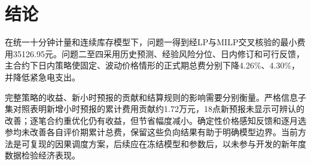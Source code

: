 \section{结论}
在统一十分钟计量和连续库存模型下，问题一得到经LP与MILP交叉核验的最小费用35126.95元。问题二至四采用历史预测、经验风险分位、日内修订和可行反馈，主合约下日内策略使固定、波动价格情形的正式期总费分别下降4.26\%、4.30\%，并降低紧急电支出。

完整策略的收益、新小时预报的贡献和结算规则的影响需要分别衡量。严格信息子集对照表明新增小时预报的累计费用贡献约1.72万元，18点新预报未显示可辨认的改善；逐笔合约重优化仍有收益，但节省幅度减小。确定性价格感知反馈和逐月选参均未改善各自评价期累计总费，保留这些负向结果有助于明确模型边界。当前方法是可复现的因果调度方案，后续应在冻结模型和参数后，以未参与开发的新年度数据检验经济表现。
